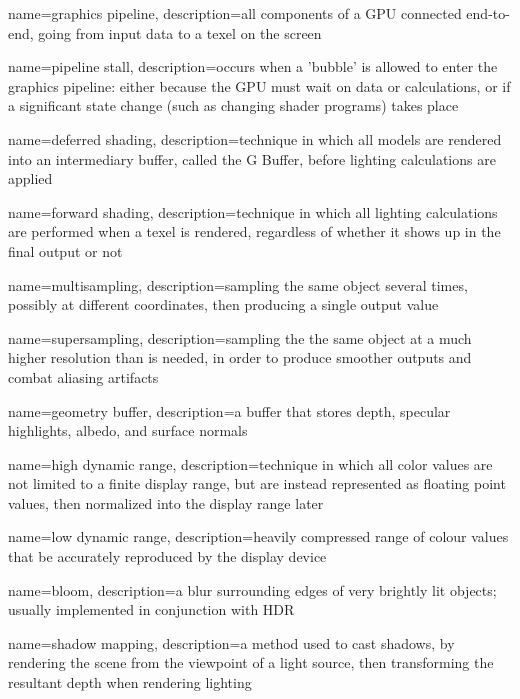  {
  name=graphics pipeline,
  description={all components of a \gls{GPU} connected end-to-end, going from input data to a \gls{texel} on the screen}
}

 {
  name=pipeline stall,
  description={occurs when a 'bubble' is allowed to enter the \gls{graphics pipeline}: either because the \gls{GPU} must wait on data or calculations, or if a significant state change (such as changing \gls{shader} programs) takes place}
}

 {
  name=deferred shading,
  description={technique in which all models are rendered into an intermediary buffer, called the \gls{G Buffer}, before lighting calculations are applied}
}

 {
  name=forward shading,
  description={technique in which all lighting calculations are performed when a texel is rendered, regardless of whether it shows up in the final output or not}
}

 {
  name=multisampling,
  description={sampling the same object several times, possibly at different coordinates, then producing a single output value}
}

 {
  name=supersampling,
  description={sampling the the same object at a much higher resolution than is needed, in order to produce smoother outputs and combat aliasing artifacts}
}

 {
  name=geometry buffer,
  description={a buffer that stores depth, specular highlights, albedo, and surface normals}
}

 {
  name=high dynamic range,
  description={technique in which all color values are not limited to a finite display range, but are instead represented as \gls{floating point} values, then normalized into the display range later}
}

 {
  name=low dynamic range,
  description={heavily compressed range of colour values that be accurately reproduced by the display device}
}

 {
  name=bloom,
  description={a blur surrounding edges of very brightly lit objects; usually implemented in conjunction with \gls{HDR}}
}

 {
  name=shadow mapping,
  description={a method used to cast shadows, by rendering the scene from the viewpoint of a light source, then transforming the resultant depth when rendering lighting}
}

